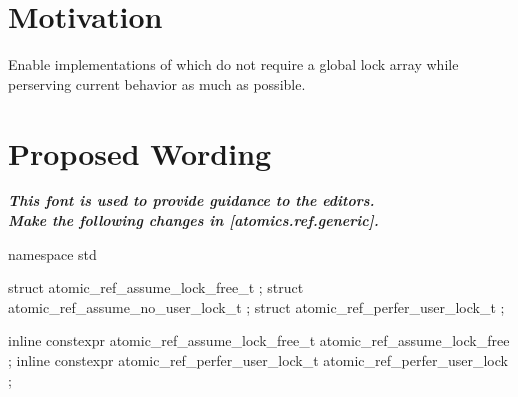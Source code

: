 \section*{Motivation}

Enable implementations of  which do not require a global lock array
while perserving current behavior as much as possible.

\section*{Proposed Wording}

\textbf{\textit{This font is used to provide guidance to the editors.}} \\

\textbf{\textit{Make the following changes in [atomics.ref.generic].}} \\

%
%

\begin{addedblock}
\begin{codeblock}
namespace std {
  struct atomic_ref_assume_lock_free_t    {};
  struct atomic_ref_assume_no_user_lock_t {};
  struct atomic_ref_perfer_user_lock_t    {};
  
  inline constexpr atomic_ref_assume_lock_free_t  atomic_ref_assume_lock_free {};
  inline constexpr atomic_ref_perfer_user_lock_t  atomic_ref_perfer_user_lock {};
}
\end{codeblock}
\end{addedblock}


